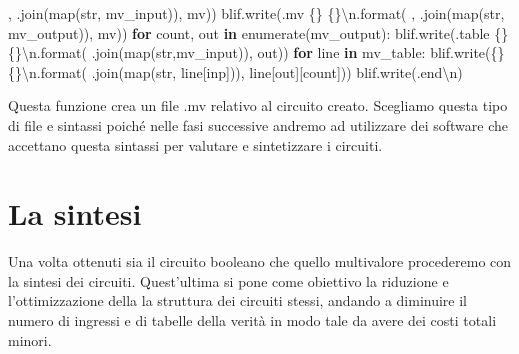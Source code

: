 \documentclass[
  italian,
]{book}
\newenvironment{Shaded}{\begin{snugshade}}{\end{snugshade}}
\newcommand{\BuiltInTok}[1]{#1}
\newcommand{\CharTok}[1]{\textcolor[rgb]{0.31,0.60,0.02}{#1}}
\newcommand{\ControlFlowTok}[1]{\textcolor[rgb]{0.13,0.29,0.53}{\textbf{#1}}}
\newcommand{\KeywordTok}[1]{\textcolor[rgb]{0.13,0.29,0.53}{\textbf{#1}}}
\newcommand{\NormalTok}[1]{#1}
\newcommand{\SpecialCharTok}[1]{\textcolor[rgb]{0.00,0.00,0.00}{#1}}
\newcommand{\StringTok}[1]{\textcolor[rgb]{0.31,0.60,0.02}{#1}}
\begin{document}
\begin{Shaded}
\begin{Highlighting}[]
      \StringTok{\textquotesingle{}, \textquotesingle{}}\NormalTok{.join(}\BuiltInTok{map}\NormalTok{(}\BuiltInTok{str}\NormalTok{, mv\_input)), mv))}
\NormalTok{  blif.write(}\StringTok{\textquotesingle{}.mv }\SpecialCharTok{\{\}}\StringTok{ }\SpecialCharTok{\{\}}\CharTok{\textbackslash{}n}\StringTok{\textquotesingle{}}\NormalTok{.}\BuiltInTok{format}\NormalTok{(}
      \StringTok{\textquotesingle{}, \textquotesingle{}}\NormalTok{.join(}\BuiltInTok{map}\NormalTok{(}\BuiltInTok{str}\NormalTok{, mv\_output)), mv))}
  \ControlFlowTok{for}\NormalTok{ count, out }\KeywordTok{in} \BuiltInTok{enumerate}\NormalTok{(mv\_output):}
\NormalTok{      blif.write(}\StringTok{\textquotesingle{}.table }\SpecialCharTok{\{\}}\StringTok{ }\SpecialCharTok{\{\}}\CharTok{\textbackslash{}n}\StringTok{\textquotesingle{}}\NormalTok{.}\BuiltInTok{format}\NormalTok{(}\StringTok{\textquotesingle{} \textquotesingle{}}\NormalTok{.join(}\BuiltInTok{map}\NormalTok{(}\BuiltInTok{str}\NormalTok{,mv\_input)), out))}
    \ControlFlowTok{for}\NormalTok{ line }\KeywordTok{in}\NormalTok{ mv\_table:}
\NormalTok{      blif.write(}\StringTok{\textquotesingle{}}\SpecialCharTok{\{\}}\StringTok{ }\SpecialCharTok{\{\}}\CharTok{\textbackslash{}n}\StringTok{\textquotesingle{}}\NormalTok{.}\BuiltInTok{format}\NormalTok{(}
        \StringTok{\textquotesingle{} \textquotesingle{}}\NormalTok{.join(}\BuiltInTok{map}\NormalTok{(}\BuiltInTok{str}\NormalTok{, line[}\StringTok{\textquotesingle{}inp\textquotesingle{}}\NormalTok{])), line[}\StringTok{\textquotesingle{}out\textquotesingle{}}\NormalTok{][count]))}
\NormalTok{  blif.write(}\StringTok{\textquotesingle{}.end}\CharTok{\textbackslash{}n}\StringTok{\textquotesingle{}}\NormalTok{)}
\end{Highlighting}
\end{Shaded}

Questa funzione crea un file .mv relativo al circuito creato. Scegliamo questa tipo di file e sintassi poiché nelle fasi successive andremo ad utilizzare dei software che accettano questa sintassi per valutare e sintetizzare i circuiti.

\newpage

\hypertarget{la-sintesi}{%
\section{La sintesi}\label{la-sintesi}}

Una volta ottenuti sia il circuito booleano che quello multivalore procederemo con la sintesi dei circuiti. Quest'ultima si pone come obiettivo la riduzione e l'ottimizzazione della la struttura dei circuiti stessi, andando a diminuire il numero di ingressi e di tabelle della verità in modo tale da avere dei costi totali minori.
\end{document}
